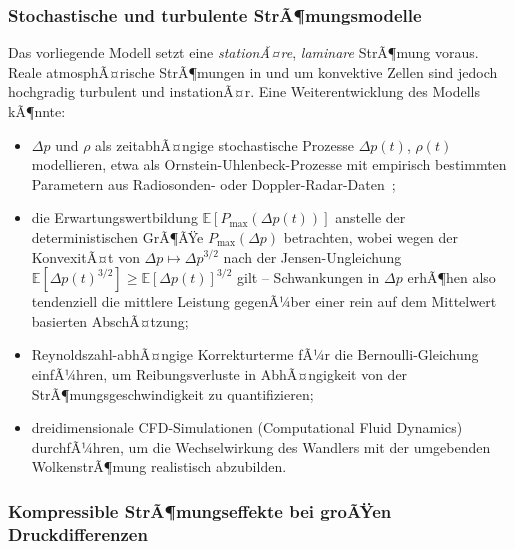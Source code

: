 ﻿\documentclass[a4paper,12pt]{article}
\theoremstyle{definition}
\begin{document}
\subsubsection{Stochastische und turbulente StrÃ¶mungsmodelle}

Das vorliegende Modell setzt eine \emph{stationÃ¤re}, \emph{laminare}
StrÃ¶mung voraus. Reale atmosphÃ¤rische StrÃ¶mungen in und um konvektive
Zellen sind jedoch hochgradig turbulent und instationÃ¤r. Eine
Weiterentwicklung des Modells kÃ¶nnte:

\begin{itemize}
	\item $\Delta p$ und $\rho$ als zeitabhÃ¤ngige stochastische Prozesse
	$\Delta p(t)$, $\rho(t)$ modellieren, etwa als
	Ornstein-Uhlenbeck-Prozesse mit empirisch bestimmten Parametern aus
	Radiosonden- oder Doppler-Radar-Daten~\cite{markowski2010};
	\item die Erwartungswertbildung $\mathbb{E}[P_{\max}(\Delta p(t))]$
	anstelle der deterministischen GrÃ¶ÃŸe $P_{\max}(\Delta p)$
	betrachten, wobei wegen der KonvexitÃ¤t von $\Delta p \mapsto
	\Delta p^{3/2}$ nach der Jensen-Ungleichung
	$\mathbb{E}[\Delta p(t)^{3/2}] \geq \mathbb{E}[\Delta p(t)]^{3/2}$
	gilt -- Schwankungen in $\Delta p$ erhÃ¶hen also tendenziell die
	mittlere Leistung gegenÃ¼ber einer rein auf dem Mittelwert basierten
	AbschÃ¤tzung;
	\item Reynoldszahl-abhÃ¤ngige Korrekturterme fÃ¼r die
	Bernoulli-Gleichung einfÃ¼hren, um Reibungsverluste in AbhÃ¤ngigkeit
	von der StrÃ¶mungsgeschwindigkeit zu quantifizieren;
	\item dreidimensionale CFD-Simulationen (Computational Fluid
	Dynamics) durchfÃ¼hren, um die Wechselwirkung des Wandlers mit der
	umgebenden WolkenstrÃ¶mung realistisch abzubilden.
\end{itemize}

\subsubsection{Kompressible StrÃ¶mungseffekte bei groÃŸen Druckdifferenzen}
\end{document}

